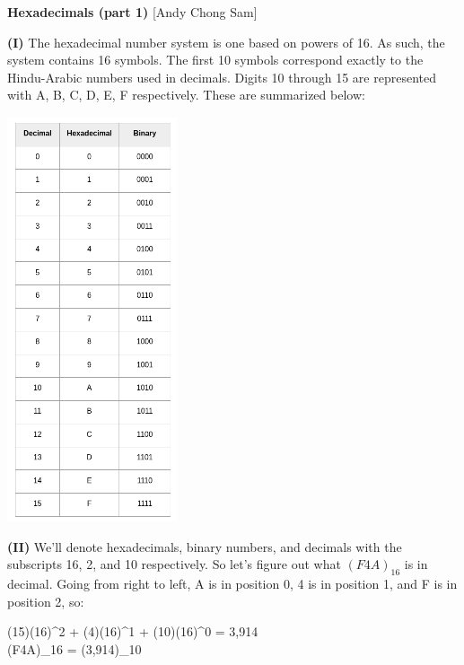 \documentclass[12pt]{article}
\begin{document}
	
	\begin{center}
		\par\noindent \large \textbf{Hexadecimals (part 1)}  [Andy Chong Sam]
	\end{center}
	\begin{minipage}[t]{.5\linewidth}
		
		\par\noindent \textbf{(I)} The hexadecimal number system is one based on powers of 16. As such, the system contains 16 symbols. The first 10 symbols correspond exactly to the Hindu-Arabic numbers used in decimals. Digits 10 through 15 are represented with A, B, C, D, E, F respectively. These are summarized below:
		
		\begin{center}
			\includegraphics[width=5.0cm]{hex-chart.png}
		\end{center}
	
		\par\noindent \textbf{(II)} We'll denote hexadecimals, binary numbers, and decimals with the subscripts 16, 2, and 10 respectively. So let's figure out what \( (F4A)_{16} \) is in decimal. Going from right to left, A is in position 0, 4 is in position 1, and F is in position 2, so:
		
		\begin{flalign*}
			(15)(16)^2 + (4)(16)^1 + (10)(16)^0 = 3,914 \\
			 (F4A)_{16} = (3,914)_{10}
		\end{flalign*} 
	
		
		
	\end{minipage}	
\end{document}
